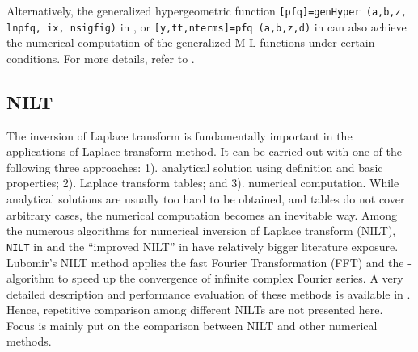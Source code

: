 \documentclass[11pt]{tCON2e}
\theoremstyle{plain}\newtheorem{theorem}{Theorem}
\theoremstyle{definition}
\theoremstyle{remark}
\begin{document}
Alternatively, the generalized hypergeometric function {\tt [pfq]=genHyper (a,b,z, lnpfq, ix, nsigfig)} in \cite{ref:genHyper}, or {\tt [y,tt,nterms]=pfq (a,b,z,d)} in \cite{ref:pFq} can also achieve the numerical computation of the generalized M-L functions under certain conditions. For more details, refer to \cite{ref:generalized_ML_Chaurasia}.




\subsection{NILT}

The inversion of Laplace transform is fundamentally important in the applications of Laplace transform method. It can be carried out with one of the following three approaches: 1). analytical solution using definition and basic properties; 2). Laplace transform tables; and 3). numerical computation. While analytical solutions are usually too hard to be obtained, and tables do not cover arbitrary cases, the numerical computation becomes an inevitable way. Among the numerous algorithms for numerical inversion of Laplace transform (NILT), {\tt NILT} in \cite{ref:INVLAP_1982, ref:Liangjinsong_phd_thesis} and the ``improved NILT'' in \cite{ref:Lubomir_NILT1, ref:Lubomir_NILT_improved, ref:Lubomir_NILT} have relatively bigger literature exposure.
Lubomir's NILT method applies the fast Fourier Transformation (FFT) and the -algorithm to speed up the convergence of infinite complex Fourier series. A very detailed description and performance evaluation of these methods is available in \cite{ref:Shenghu_NILT}. Hence, repetitive comparison among different NILTs are not presented here. Focus is mainly put on the comparison between NILT and other numerical methods.
\end{document}
